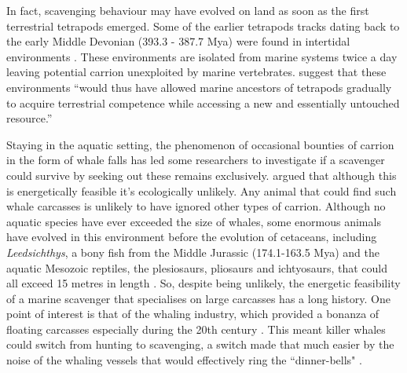 \documentclass[a4paper,12pt]{article}
\begin{document}
In fact, scavenging behaviour may have evolved on land as soon as the first terrestrial tetrapods emerged.
Some of the earlier tetrapods tracks dating back to the early Middle Devonian (393.3 - 387.7 Mya) were found in intertidal environments \citep{Niedzwiedzki2009}.
These environments are isolated from marine systems twice a day leaving potential carrion unexploited by marine vertebrates.
\cite{Niedzwiedzki2009} suggest that these environments ``would thus have allowed marine ancestors of tetrapods gradually to acquire terrestrial competence while accessing a new and essentially untouched resource.''


Staying in the aquatic setting, the phenomenon of occasional bounties of carrion in the form of whale falls has led some researchers to investigate if a scavenger could survive by seeking out these remains exclusively.
\cite{ruxton2005searching} argued that although this is energetically feasible it's ecologically unlikely.
Any animal that could find such whale carcasses is unlikely to have ignored other types of carrion.
Although no aquatic species have ever exceeded the size of whales, some enormous animals have evolved in this environment before the evolution of cetaceans, including \textit{Leedsichthys}, a bony fish from the Middle Jurassic (174.1-163.5 Mya) and the aquatic Mesozoic reptiles, the plesiosaurs, pliosaurs and ichtyosaurs, that could all exceed 15 metres in length \citep{ruxton2011zoology}.
So, despite being unlikely, the energetic feasibility of a marine scavenger that specialises on large carcasses has a long history.
One point of interest is that of the whaling industry, which provided a bonanza of floating carcasses especially during the 20th century \citep{Whitehead415}.
This meant killer whales could switch from hunting to scavenging, a switch made that much easier by the noise of the whaling vessels that would effectively ring the ``dinner-bells" \citep{Whitehead415}.
\end{document}
